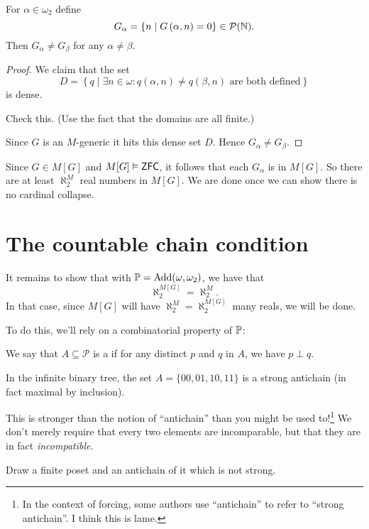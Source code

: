 \begin{lemma}
	For $\alpha \in \omega_2$ define
	\[ G_\alpha = \left\{ n \mid G\left( \alpha,n \right) = 0 \right\} \in \mathcal P(\mathbb N). \]
	Then $G_\alpha \neq G_\beta$ for any $\alpha \neq \beta$.
\end{lemma}
\begin{proof}
	We claim that the set
	\[ D = \left\{ q \mid \exists n \in \omega :
		q\left( \alpha, n \right) \neq q\left( \beta, n \right)
		\text{ are both defined}
	\right\} \]
	is dense.
	\begin{ques}
		Check this.
		(Use the fact that the domains are all finite.)
	\end{ques}

	Since $G$ is an $M$-generic it hits this dense set $D$.
	Hence $G_\alpha \neq G_\beta$.
\end{proof}

Since $G \in M[G]$ and $M[G] \vDash \mathsf{ZFC}$,
it follows that each $G_\alpha$ is in $M[G]$.
So there are at least $\aleph_2^M$ real numbers in $M[G]$.
We are done once we can show there is no cardinal collapse.

\section{The countable chain condition}
It remains to show that with $\mathbb P = \operatorname{Add}(\omega, \omega_2)$, we have that
\[ \aleph_2^{M[G]} = \aleph_2^M. \]
In that case, since $M[G]$ will have $\aleph_2^M = \aleph_2^{M[G]}$ many reals, we will be done.

To do this, we'll rely on a combinatorial property of $\mathbb P$:
\begin{definition}
	We say that $A \subseteq \mathcal P$ is a 
	if for any distinct $p$ and $q$ in $A$, we have $p \perp q$.
\end{definition}
\begin{example}
	In the infinite binary tree,
	the set $A = \{00, 01, 10, 11\}$ is a strong antichain
	(in fact maximal by inclusion).
\end{example}
This is stronger than the notion of ``antichain'' than you might be used to!\footnote{%
	In the context of forcing, some authors use ``antichain'' to refer to ``strong antichain''.
	I think this is lame.}
We don't merely require that every two elements are incomparable,
but that they are in fact \emph{incompatible}.
\begin{ques}
	Draw a finite poset and an antichain of it which is not strong.
\end{ques}

